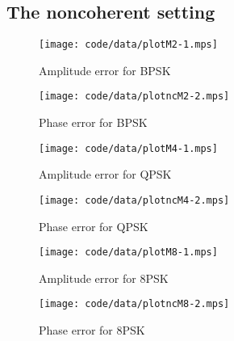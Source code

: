 \documentclass[journal]{IEEEtran}
\begin{document}

\subsection{The noncoherent setting}

 \begin{figure*}[tp]
 	\centering
 		\texttt{[image: code/data/plotM2-1.mps]}
 		\caption{Amplitude error for BPSK}
 		\label{fig:plotamp}
 \end{figure*}


\begin{figure*}[tp]
	\centering
		\texttt{[image: code/data/plotncM2-2.mps]}
		\caption{Phase error for BPSK}
		\label{fig:plotphase}
\end{figure*}


 \begin{figure*}[tp]
 	\centering
 		\texttt{[image: code/data/plotM4-1.mps]}
 		\caption{Amplitude error for QPSK}
 		\label{fig:plotamp}
 \end{figure*}


\begin{figure*}[tp]
	\centering
		\texttt{[image: code/data/plotncM4-2.mps]}
		\caption{Phase error for QPSK}
		\label{fig:plotphase}
\end{figure*}


 \begin{figure*}[tp]
 	\centering
 		\texttt{[image: code/data/plotM8-1.mps]}
 		\caption{Amplitude error for 8PSK}
 		\label{fig:plotamp}
 \end{figure*}


\begin{figure*}[tp]
	\centering
		\texttt{[image: code/data/plotncM8-2.mps]}
		\caption{Phase error for 8PSK}
		\label{fig:plotphase}
\end{figure*}





\end{document}
